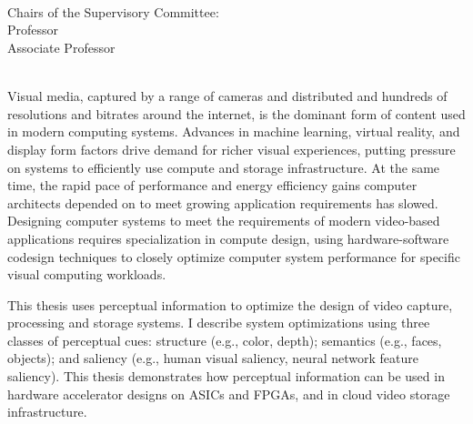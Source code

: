 \begingroup
\let\clearpage\relax
\let\cleardoublepage\relax
\let\cleardoublepage\relax

\thispagestyle{empty}
\begin{center}
     \\
    \bigskip
    {\color{CTtitle}\spacedallcaps{\myTitle} \\ \bigskip
    }
    \bigskip
    \myName \\
    \bigskip
    Chairs of the Supervisory Committee: \\
    Professor \myChair \\
    Associate Professor \myOtherChair \\
    \myDepartment \\
    \bigskip
\end{center}


Visual media, captured by a range of cameras and distributed and hundreds of resolutions and bitrates around the internet, is the dominant form of content used in modern computing systems.
Advances in machine learning, virtual reality, and display form factors drive demand for richer visual experiences, putting pressure on systems to efficiently use compute and storage infrastructure.
At the same time, the rapid pace of performance and energy efficiency gains computer architects depended on to meet growing application requirements has slowed.
Designing computer systems to meet the requirements of modern video-based applications requires specialization in compute design, using hardware-software codesign techniques to closely optimize computer system performance for specific visual computing workloads.

This thesis uses perceptual information to optimize the design of video capture, processing and storage systems.
I describe system optimizations using three classes of perceptual cues: structure (e.g., color, depth); semantics (e.g., faces, objects); and saliency (e.g., human visual saliency, neural network feature saliency).
This thesis demonstrates how perceptual information can be used in hardware accelerator designs on ASICs and FPGAs, and in cloud video storage infrastructure.

\endgroup

\vfill

